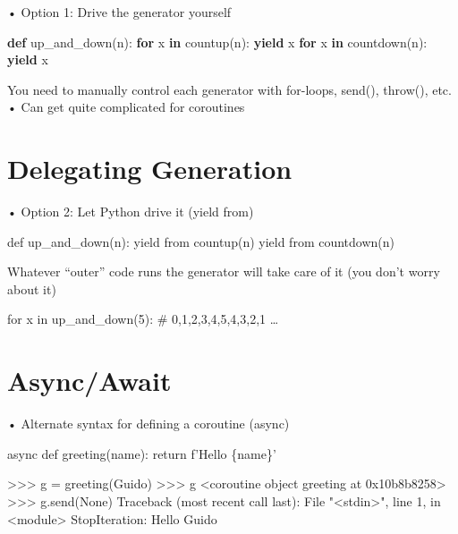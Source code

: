 \documentclass[
  letterpaper,
  DIV=11,
  numbers=noendperiod]{scrreprt}
\newenvironment{Shaded}{\begin{snugshade}}{\end{snugshade}}
\newcommand{\ControlFlowTok}[1]{\textcolor[rgb]{0.00,0.23,0.31}{\textbf{#1}}}
\newcommand{\KeywordTok}[1]{\textcolor[rgb]{0.00,0.23,0.31}{\textbf{#1}}}
\newcommand{\NormalTok}[1]{\textcolor[rgb]{0.00,0.23,0.31}{#1}}
\begin{document}
• Option 1: Drive the generator yourself

\begin{Shaded}
\begin{Highlighting}[]
\KeywordTok{def}\NormalTok{ up\_and\_down(n):}
    \ControlFlowTok{for}\NormalTok{ x }\KeywordTok{in}\NormalTok{ countup(n):}
        \ControlFlowTok{yield}\NormalTok{ x}
    \ControlFlowTok{for}\NormalTok{ x }\KeywordTok{in}\NormalTok{ countdown(n):}
        \ControlFlowTok{yield}\NormalTok{ x }
\end{Highlighting}
\end{Shaded}

You need to manually control each generator with for-loops, send(),
throw(), etc.\\
• Can get quite complicated for coroutines


\chapter{Delegating Generation}\label{delegating-generation-2}

• Option 2: Let Python drive it (yield from)

def up\_and\_down(n): yield from countup(n) yield from countdown(n)

Whatever ``outer'' code runs the generator will take care of it (you
don't worry about it)

for x in up\_and\_down(5): \# 0,1,2,3,4,5,4,3,2,1 \ldots{}


\chapter{Async/Await}\label{asyncawait}

• Alternate syntax for defining a coroutine (async)

async def greeting(name): return f'Hello \{name\}'

\begin{Shaded}
\begin{Highlighting}[]
\NormalTok{\textgreater{}\textgreater{}\textgreater{} g = greeting(\textquotesingle{}Guido\textquotesingle{})}
\NormalTok{\textgreater{}\textgreater{}\textgreater{} g}
\NormalTok{\textless{}coroutine object greeting at 0x10b8b8258\textgreater{}}
\NormalTok{\textgreater{}\textgreater{}\textgreater{} g.send(None)}
\NormalTok{Traceback (most recent call last):}
\NormalTok{    File "\textless{}stdin\textgreater{}", line 1, in \textless{}module\textgreater{}}
\NormalTok{StopIteration: Hello Guido }
\end{Highlighting}
\end{Shaded}
\end{document}
